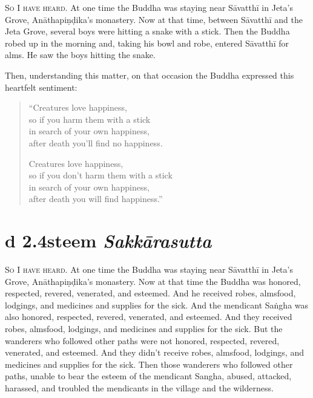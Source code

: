 \documentclass[12pt,openany]{book}%
\newcommand*{\suttatitleacronym}[1]{\smaller[2]{#1}\vspace*{.3em}}
\newcommand*{\suttatitletranslation}[1]{\linebreak{#1}}
\newcommand*{\suttatitleroot}[1]{\linebreak\smaller[2]\itshape{#1}}
\newcommand*{\tocacronym}[1]{\hspace*{-3.3em}{#1}\quad}
\newcommand*{\toctranslation}[1]{#1}
\newcommand*{\tocroot}[1]{(\textit{#1})}
\newcommand*{\scevam}[1]{\textsc{#1}}
\begin{document}
\scevam{So I have heard. }At one time the Buddha was staying near \textsanskrit{Sāvatthī} in Jeta’s Grove, \textsanskrit{Anāthapiṇḍika}’s monastery. Now at that time, between \textsanskrit{Sāvatthī} and the Jeta Grove, several boys were hitting a snake with a stick. Then the Buddha robed up in the morning and, taking his bowl and robe, entered \textsanskrit{Sāvatthī} for alms. He saw the boys hitting the snake. 

Then, understanding this matter, on that occasion the Buddha expressed this heartfelt sentiment: 

\begin{verse}%
“Creatures love happiness, \\
so if you harm them with a stick \\
in search of your own happiness, \\
after death you’ll find no happiness. 

Creatures love happiness, \\
so if you don’t harm them with a stick \\
in search of your own happiness, \\
after death you will find happiness.” 

%
\end{verse}

%
\section*{{\suttatitleacronym Ud 2.4}{\suttatitletranslation Esteem }{\suttatitleroot Sakkārasutta}}
\addcontentsline{toc}{section}{\tocacronym{Ud 2.4} \toctranslation{Esteem } \tocroot{Sakkārasutta}}

\scevam{So I have heard. }At one time the Buddha was staying near \textsanskrit{Sāvatthī} in Jeta’s Grove, \textsanskrit{Anāthapiṇḍika}’s monastery. Now at that time the Buddha was honored, respected, revered, venerated, and esteemed. And he received robes, almsfood, lodgings, and medicines and supplies for the sick. And the mendicant \textsanskrit{Saṅgha} was also honored, respected, revered, venerated, and esteemed. And they received robes, almsfood, lodgings, and medicines and supplies for the sick. But the wanderers who followed other paths were not honored, respected, revered, venerated, and esteemed. And they didn’t receive robes, almsfood, lodgings, and medicines and supplies for the sick. Then those wanderers who followed other paths, unable to bear the esteem of the mendicant Sangha, abused, attacked, harassed, and troubled the mendicants in the village and the wilderness. 
\end{document}
